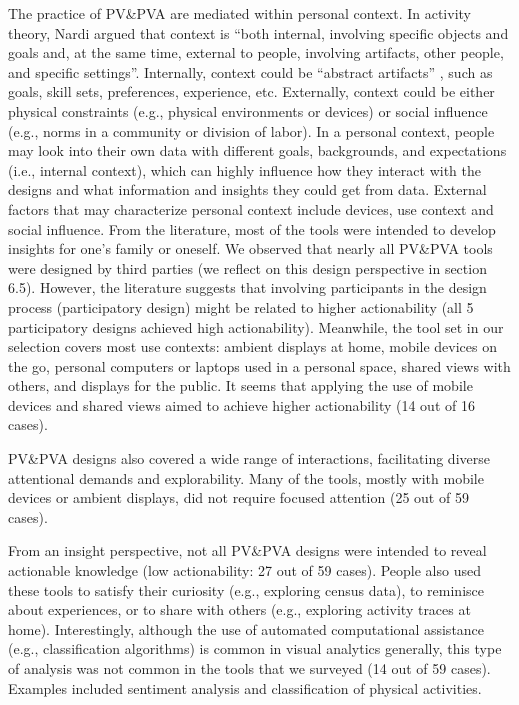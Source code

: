 \documentclass[12pt,oneside]{book}
\begin{document}
The practice of PV\&PVA are mediated within personal context. In activity theory, Nardi \cite{nardi_context_1995} argued that context is ``both internal, involving specific objects and goals and, at the same time, external to people, involving artifacts, other people, and specific settings''.  Internally, context could be ``abstract artifacts'' \cite{kaptelinin_acting_2009}, such as goals, skill sets, preferences, experience, etc.  Externally, context could be either physical constraints (e.g., physical environments or devices) or social influence (e.g., norms in a community or division of labor).  In a personal context, people may look into their own data with different goals, backgrounds, and expectations (i.e., internal context), which can highly influence how they interact with the designs and what information and insights they could get from data.  External factors that may characterize personal context include devices, use context and social influence.  From the literature, most of the tools were intended to develop insights for one's family or oneself.  We observed that nearly all PV\&PVA tools were designed by third parties (we reflect on this design perspective in section 6.5).  However, the literature suggests that involving participants in the design process (participatory design) might be related to higher actionability (all 5 participatory designs achieved high actionability).  Meanwhile, the tool set in our selection covers most use contexts: ambient displays at home, mobile devices on the go, personal computers or laptops used in a personal space, shared views with others, and displays for the public. It seems that applying the use of mobile devices and shared views aimed to achieve higher actionability (14 out of 16 cases).

PV\&PVA designs also covered a wide range of interactions, facilitating diverse attentional demands and explorability.  Many of the tools, mostly with mobile devices or ambient displays, did not require focused attention (25 out of 59 cases).

From an insight perspective, not all PV\&PVA designs were intended to reveal actionable knowledge (low actionability: 27 out of 59 cases).  People also used these tools to satisfy their curiosity (e.g., exploring census data), to reminisce about experiences, or to share with others (e.g., exploring activity traces at home).  Interestingly, although the use of automated computational assistance (e.g., classification algorithms) is common in visual analytics generally, this type of analysis was not common in the tools that we surveyed (14 out of 59 cases).  Examples included sentiment analysis and classification of physical activities.
\end{document}
